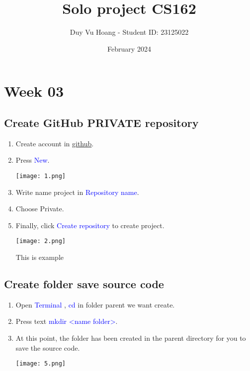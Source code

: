 \documentclass[12pt]{scrartcl}
\title{Solo project CS162}
\author{Duy Vu Hoang - Student ID: 23125022}
\date{February 2024}
\begin{document}
\maketitle

\tableofcontents

\newpage

\section{Week 03}
\subsection{ Create GitHub PRIVATE repository}

\begin{enumerate}
    \item Create account in \href{https://github.com}{github}.
    \item Press \textcolor{blue}{New}.
        \begin{center}
            \texttt{[image: 1.png]}
        \end{center}
    \item Write name project in \textcolor{blue}{Repository name}.
    \item Choose Private.
    \item Finally, click \textcolor{blue}{Create repository} to create project.
    
        \begin{center}
            \texttt{[image: 2.png]}
        \end{center}

        \begin{center}
        This is example
        \end{center}
    
\end{enumerate}

\newpage

\subsection{Create folder save source code}

\begin{enumerate}
    \item Open \textcolor{blue}{Terminal} , \textcolor{blue}{cd} in folder parent we want create.
    \item Press text \textcolor{blue}{mkdir <name folder>}.
   \item At this point, the folder has been created in the parent directory for you to save the source code.
        \begin{center}
            \texttt{[image: 5.png]}
        \end{center}
    
\end{enumerate}
\end{document}
